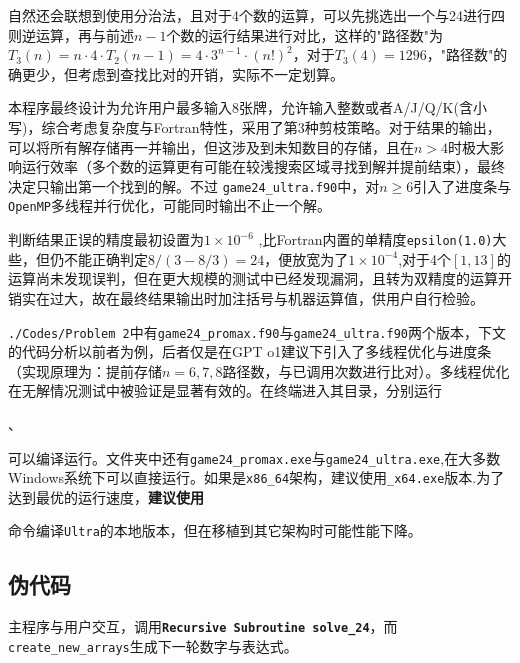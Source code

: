 自然还会联想到使用分治法，且对于4个数的运算，可以先挑选出一个与24进行四则逆运算，再与前述$n-1$个数的运行结果进行对比，这样的"路径数"为$T_3(n) = n \cdot 4 \cdot T_{2}(n-1) = 4 \cdot 3^{n-1} \cdot (n!)^2$，对于$T_3(4)=1296$，"路径数"的确更少，但考虑到查找比对的开销，实际不一定划算。

本程序最终设计为允许用户最多输入$8$张牌，允许输入整数或者A/J/Q/K(含小写)，综合考虑复杂度与Fortran特性，采用了第3种剪枝策略。对于结果的输出，可以将所有解存储再一并输出，但这涉及到未知数目的存储，且在$n>4$时极大影响运行效率（多个数的运算更有可能在较浅搜索区域寻找到解并提前结束），最终决定只输出第一个找到的解。不过 \texttt{game24\_ultra.f90}中，对$n\ge 6 $引入了进度条与\texttt{OpenMP}多线程并行优化，可能同时输出不止一个解。

判断结果正误的精度最初设置为$1 \times 10^{-6}$
,比Fortran内置的单精度\texttt{epsilon(1.0)}大些，但仍不能正确判定$8/(3-8/3) = 24$，便放宽为了$1 \times 10^{-4}$,对于4个$[1,13]$的运算尚未发现误判，但在更大规模的测试中已经发现漏洞，且转为双精度的运算开销实在过大，故在最终结果输出时加注括号与机器运算值，供用户自行检验。

\texttt{./Codes/Problem 2}中有\texttt{game24\_promax.f90}与\texttt{game24\_ultra.f90}两个版本，下文的代码分析以前者为例，后者仅是在GPT o1建议下引入了多线程优化与进度条（实现原理为：提前存储$n=6,7,8$路径数，与已调用次数进行比对）。多线程优化在无解情况测试中被验证是显著有效的。在终端进入其目录，分别运行

\noindent {}、


\noindent 可以编译运行。文件夹中还有\texttt{game24\_promax.exe}与\texttt{game24\_ultra.exe},在大多数Windows系统下可以直接运行。如果是\texttt{x86\_64}架构，建议使用\texttt{\_x64.exe}版本.为了达到最优的运行速度，\textbf{建议使用}

\noindent {} 命令编译\texttt{Ultra}的本地版本，但在移植到其它架构时可能性能下降。

\subsection{伪代码}
\noindent 主程序与用户交互，调用\texttt{\textbf{Recursive Subroutine solve\_24}}，而\texttt{ create\_new\_arrays}生成下一轮数字与表达式。

